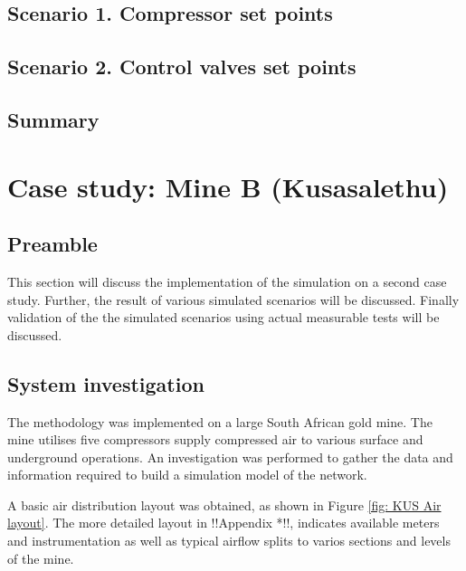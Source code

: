 \subsection{Scenario 1. Compressor set points}
\subsection{Scenario 2. Control valves set points}
\subsection{Summary}
\newpage
\section{Case study: Mine B \color{blue}(Kusasalethu)}
	\subsection{Preamble}
	 This section will discuss the implementation of the simulation on a second case study. Further, the result of various simulated scenarios will be discussed. Finally validation of the the simulated scenarios using actual measurable tests will be discussed.
	\subsection{System investigation}
	The methodology was implemented on a large South African gold mine. The mine utilises five compressors supply compressed air to various surface and underground operations. An investigation was performed to gather the data and information required to build a simulation model of the network.
	\par 
	A basic air distribution layout was obtained, as shown in Figure \ref{fig: KUS Air layout}.  The more detailed layout in !!Appendix *!!,  indicates available meters and instrumentation as well as typical airflow splits to varios sections and levels of the mine.
	\par 
	
